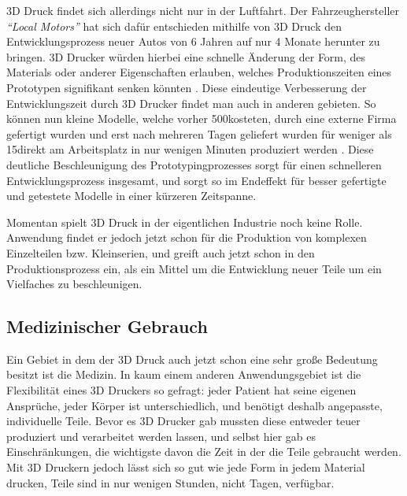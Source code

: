 3D Druck findet sich allerdings nicht nur in der Luftfahrt. Der Fahrzeughersteller \emph{\textquotedblleft Local Motors\textquotedblright} hat sich dafür entschieden mithilfe von 3D Druck den Entwicklungsprozess neuer Autos von 6 Jahren auf nur 4 Monate herunter zu bringen. 3D Drucker würden hierbei eine schnelle Änderung der Form, des Materials oder anderer Eigenschaften erlauben, welches Produktionszeiten eines Prototypen signifikant senken könnten \parencite{Local_Motor}. 
Diese eindeutige Verbesserung der Entwicklungszeit durch 3D Drucker findet man auch in anderen gebieten. So können nun kleine Modelle, welche vorher 500\EURO kosteten, durch eine externe Firma gefertigt wurden und erst nach mehreren Tagen geliefert wurden für weniger als 15\EURO direkt am Arbeitsplatz in nur wenigen Minuten produziert werden \parencite{BALDOR_CASE}.
Diese deutliche Beschleunigung des Prototypingprozesses sorgt für einen schnelleren Entwicklungsprozess insgesamt, und sorgt so im Endeffekt für besser gefertigte und getestete Modelle in einer kürzeren Zeitspanne.

Momentan spielt 3D Druck in der eigentlichen Industrie noch keine Rolle. Anwendung findet er jedoch jetzt schon für die Produktion von komplexen Einzelteilen bzw. Kleinserien, und greift auch jetzt schon in den Produktionsprozess ein, als ein Mittel um die Entwicklung neuer Teile um ein Vielfaches zu beschleunigen.

\subsection{Medizinischer Gebrauch}

Ein Gebiet in dem der 3D Druck auch jetzt schon eine sehr große Bedeutung besitzt ist die Medizin. In kaum einem anderen Anwendungsgebiet ist die Flexibilität eines 3D Druckers so gefragt: jeder Patient hat seine eigenen Ansprüche, jeder Körper ist unterschiedlich, und benötigt deshalb angepasste, individuelle Teile. Bevor es 3D Drucker gab mussten diese entweder teuer produziert und verarbeitet werden lassen, und selbst hier gab es Einschränkungen, die wichtigste davon die Zeit in der die Teile gebraucht werden. Mit 3D Druckern jedoch lässt sich so gut wie jede Form in jedem Material drucken, Teile sind in nur wenigen Stunden, nicht Tagen, verfügbar.

